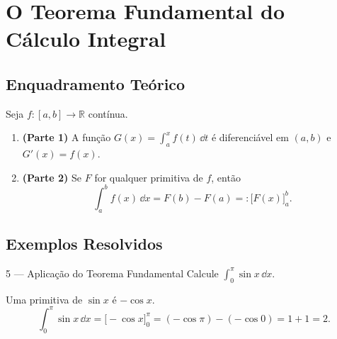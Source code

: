 
\section{O Teorema Fundamental do Cálculo Integral}

\subsection{Enquadramento Teórico}

\begin{thmbox}[title={Teorema Fundamental do Cálculo Integral}]
  Seja $f:[a,b]\to\mathbb{R}$ contínua.
  \begin{enumerate}
    \item \textbf{(Parte 1)} A função $G(x)=\displaystyle\int_a^x f(t)\,\dd t$
          é diferenciável em $(a,b)$ e $G'(x)=f(x)$.
    \item \textbf{(Parte 2)} Se $F$ for qualquer primitiva de $f$, então
          \[
            \int_a^b f(x)\,\dd x = F(b)-F(a) =: \Big[F(x)\Big]_a^b.
          \]
  \end{enumerate}
\end{thmbox}

\subsection{Exemplos Resolvidos}

\begin{exbox}{5 --- Aplicação do Teorema Fundamental}
  Calcule $\displaystyle\int_0^{\pi} \sin x\,\dd x$.
\end{exbox}
\begin{solbox}
  Uma primitiva de $\sin x$ é $-\cos x$.
  \[
    \int_0^{\pi}\sin x\,\dd x = \Big[-\cos x\Big]_0^{\pi}
      = (-\cos\pi)-(-\cos 0) = 1+1 = 2.
  \]
\end{solbox}
